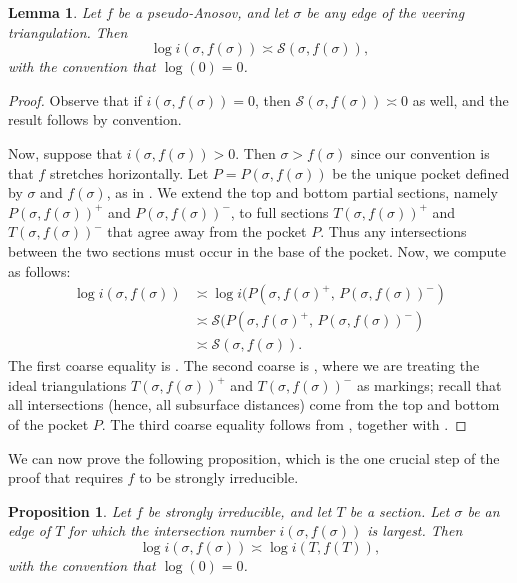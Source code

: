 \documentclass[11pt,letterpaper]{amsart}
\newcommand{\mc}{\mathcal}
\numberwithin{equation}{section}
\newtheorem{lemma}[theorem]{Lemma}
\newtheorem{proposition}[theorem]{Proposition}
\theoremstyle{definition}
\begin{document}
\begin{lemma}\label{Lem:SSumSigma}
Let $f$ be a pseudo-Anosov, and let $\sigma$ be any edge of the veering triangulation. Then
\[
\log i(\sigma, f(\sigma)) \asymp \mc S(\sigma, f(\sigma)),
\]
with the convention that $\log(0)=0$.
\end{lemma}

\begin{proof}
Observe that if $i(\sigma, f(\sigma))=0$, then  $\mc S(\sigma, f(\sigma)) \asymp 0$ as well, and the result follows by convention.

Now, suppose that $i(\sigma, f(\sigma)) > 0$. Then $\sigma > f(\sigma)$ since our convention is that $f$ stretches horizontally. Let $P = P(\sigma, f(\sigma))$ be the unique pocket defined by $\sigma$ and $f(\sigma)$, as in . We extend the top and bottom partial sections, namely $P(\sigma, f(\sigma))^+$ and $P(\sigma, f(\sigma))^-$, to full sections $T(\sigma, f(\sigma))^+$ and $T(\sigma, f(\sigma))^-$ that agree away from the pocket $P$. Thus any intersections between the two sections must occur in the base of the pocket.
Now,
we compute as follows:
\begin{align*}
\log i(\sigma, f(\sigma)) &\asymp \log i(P(\sigma, f(\sigma)^+ \!, \, P(\sigma, f(\sigma))^-) \\
&\asymp \mc S (P(\sigma, f(\sigma)^+ \!, \, P(\sigma, f(\sigma))^-) \\
& \asymp  \mc S (\sigma, f(\sigma)). 
\end{align*}
The first coarse equality is . The second coarse is , where we are treating the ideal triangulations $T(\sigma, f(\sigma))^+$ and $T(\sigma, f(\sigma))^-$  as markings; recall that all intersections (hence, all subsurface distances) come from the top and bottom of the pocket $P$.
 The third coarse equality follows from , together with .
\end{proof}

We can now prove the following proposition, which is the one crucial step of the proof that requires $f$ to be strongly irreducible.

\begin{proposition}\label{Prop:FromTriangToEdge}
Let $f$ be strongly irreducible, and let $T$ be a section. 
Let $\sigma$ be an edge of $T$ for which the intersection number $i(\sigma, f(\sigma))$ is largest. Then
\[
\log i(\sigma, f(\sigma)) \asymp \log i(T, f(T)),
\]
with the convention that $\log(0)=0$.
\end{proposition}
  
\end{document}
